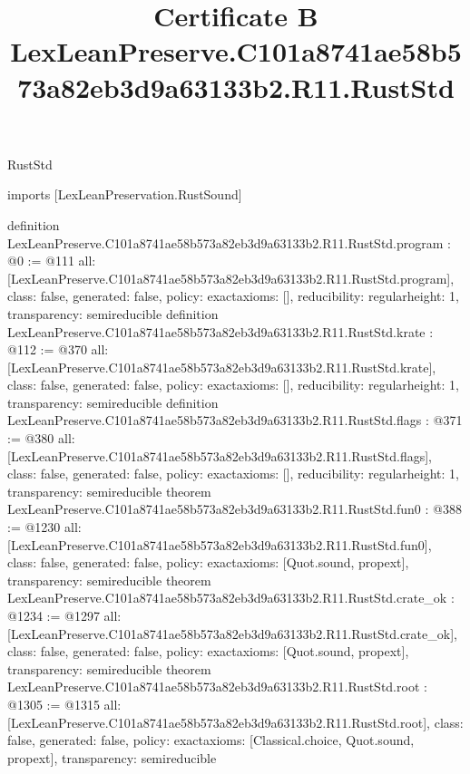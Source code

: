 \begin{lexlean}{RustStd}
\title{Certificate B LexLeanPreserve.C101a8741ae58b573a82eb3d9a63133b2.R11.RustStd}
\begin{coremodule}
imports [LexLeanPreservation.RustSound]

definition LexLeanPreserve.C101a8741ae58b573a82eb3d9a63133b2.R11.RustStd.program : @0 := @111 {
  all: [LexLeanPreserve.C101a8741ae58b573a82eb3d9a63133b2.R11.RustStd.program],
  class: false,
  generated: false,
  policy: exact{axioms: []},
  reducibility: regular{height: 1},
  transparency: semireducible
}
definition LexLeanPreserve.C101a8741ae58b573a82eb3d9a63133b2.R11.RustStd.krate : @112 := @370 {
  all: [LexLeanPreserve.C101a8741ae58b573a82eb3d9a63133b2.R11.RustStd.krate],
  class: false,
  generated: false,
  policy: exact{axioms: []},
  reducibility: regular{height: 1},
  transparency: semireducible
}
definition LexLeanPreserve.C101a8741ae58b573a82eb3d9a63133b2.R11.RustStd.flags : @371 := @380 {
  all: [LexLeanPreserve.C101a8741ae58b573a82eb3d9a63133b2.R11.RustStd.flags],
  class: false,
  generated: false,
  policy: exact{axioms: []},
  reducibility: regular{height: 1},
  transparency: semireducible
}
theorem LexLeanPreserve.C101a8741ae58b573a82eb3d9a63133b2.R11.RustStd.fun0 : @388 := @1230 {
  all: [LexLeanPreserve.C101a8741ae58b573a82eb3d9a63133b2.R11.RustStd.fun0],
  class: false,
  generated: false,
  policy: exact{axioms: [Quot.sound, propext]},
  transparency: semireducible
}
theorem LexLeanPreserve.C101a8741ae58b573a82eb3d9a63133b2.R11.RustStd.crate_ok : @1234 := @1297 {
  all: [LexLeanPreserve.C101a8741ae58b573a82eb3d9a63133b2.R11.RustStd.crate_ok],
  class: false,
  generated: false,
  policy: exact{axioms: [Quot.sound, propext]},
  transparency: semireducible
}
theorem LexLeanPreserve.C101a8741ae58b573a82eb3d9a63133b2.R11.RustStd.root : @1305 := @1315 {
  all: [LexLeanPreserve.C101a8741ae58b573a82eb3d9a63133b2.R11.RustStd.root],
  class: false,
  generated: false,
  policy: exact{axioms: [Classical.choice, Quot.sound, propext]},
  transparency: semireducible
}


\end{coremodule}
\end{lexlean}
